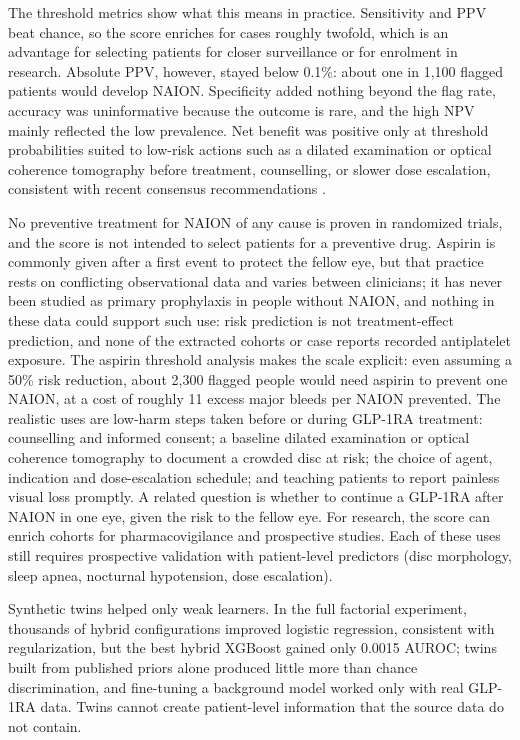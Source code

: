 \documentclass[journal]{IEEEtran}
\begin{document}
The threshold metrics show what this means in practice. Sensitivity and
PPV beat chance, so the score enriches for cases roughly twofold, which
is an advantage for selecting patients for closer surveillance or for
enrolment in research. Absolute PPV, however, stayed below 0.1\%: about
one in 1,100 flagged patients would develop NAION. Specificity added
nothing beyond the flag rate, accuracy was uninformative because the
outcome is rare, and the high NPV mainly reflected the low prevalence.
Net benefit was positive only at threshold probabilities suited to
low-risk actions such as a dilated examination or optical coherence
tomography before treatment, counselling, or slower dose escalation,
consistent with recent consensus recommendations
\cite{p42132708, p41058255}.

No preventive treatment for NAION of any cause is proven in randomized
trials, and the score is not intended to select patients for a
preventive drug. Aspirin is commonly given after a first event to
protect the fellow eye, but that practice rests on conflicting
observational data and varies between clinicians; it has never been
studied as primary prophylaxis in people without NAION, and nothing in
these data could support such use: risk prediction is not
treatment-effect prediction, and none of the extracted cohorts or case
reports recorded antiplatelet exposure. The aspirin threshold analysis
makes the scale explicit: even assuming a 50\% risk reduction, about
2,300 flagged people would need aspirin to prevent one NAION, at a cost
of roughly 11 excess major bleeds per NAION prevented. The realistic
uses are low-harm steps taken before or during GLP-1RA treatment:
counselling and informed consent; a baseline dilated examination or
optical coherence tomography to document a crowded disc at risk; the
choice of agent, indication and dose-escalation schedule; and teaching
patients to report painless visual loss promptly. A related question is
whether to continue a GLP-1RA after NAION in one eye, given the risk to
the fellow eye. For research, the score can enrich cohorts for
pharmacovigilance and prospective studies. Each of these uses still
requires prospective validation with patient-level predictors (disc
morphology, sleep apnea, nocturnal hypotension, dose escalation).

Synthetic twins helped only weak learners. In the full factorial
experiment, thousands of hybrid configurations improved logistic
regression, consistent with regularization, but the best hybrid XGBoost
gained only 0.0015 AUROC; twins built from published priors alone
produced little more than chance discrimination, and fine-tuning a
background model worked only with real GLP-1RA data. Twins cannot create
patient-level information that the source data do not contain.
\end{document}
